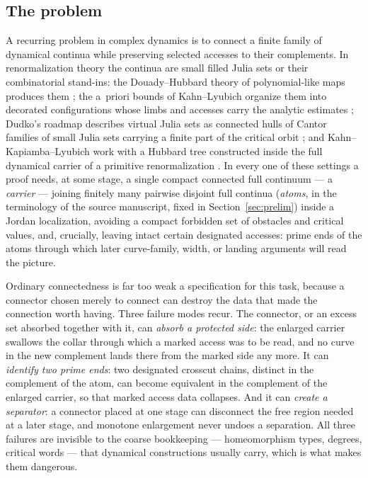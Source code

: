 \documentclass[11pt,reqno]{amsart}
\theoremstyle{definition}
\theoremstyle{remark}
\begin{document}
\subsection{The problem}\label{subsec:A-problem}

A recurring problem in complex dynamics is to connect a finite family of
dynamical continua while preserving selected accesses to their complements.
In renormalization theory the continua are small filled Julia sets or their
combinatorial stand-ins: the Douady--Hubbard theory of polynomial-like maps
produces them \cite{DH85}; the a~priori bounds of Kahn--Lyubich organize them
into decorated configurations whose limbs and accesses carry the analytic
estimates \cite{KL08}; Dudko's roadmap describes virtual Julia sets as
connected hulls of Cantor families of small Julia sets carrying a finite part
of the critical orbit \cite{Dud25}; and Kahn--Kapiamba--Lyubich work with a
Hubbard tree constructed inside the full dynamical carrier of a primitive
renormalization \cite{KKL26}.  In every one of these settings a proof needs,
at some stage, a single compact connected full continuum --- a
\emph{carrier} --- joining finitely many pairwise disjoint full continua
(\emph{atoms}, in the terminology of the source manuscript, fixed in
Section~\ref{sec:prelim}) inside a Jordan localization, avoiding a compact
forbidden set of obstacles and critical values, and, crucially, leaving
intact certain designated accesses: prime ends of the atoms through which
later curve-family, width, or landing arguments will read the picture.

Ordinary connectedness is far too weak a specification for this task,
because a connector chosen merely to connect can destroy the data that made
the connection worth having.  Three failure modes recur.  The connector, or
an excess set absorbed together with it, can \emph{absorb a protected side}:
the enlarged carrier swallows the collar through which a marked access was
to be read, and no curve in the new complement lands there from the marked
side any more.  It can \emph{identify two prime ends}: two designated
crosscut chains, distinct in the complement of the atom, can become
equivalent in the complement of the enlarged carrier, so that marked access
data collapses.  And it can \emph{create a separator}: a connector placed at
one stage can disconnect the free region needed at a later stage, and
monotone enlargement never undoes a separation.  All three failures are
invisible to the coarse bookkeeping --- homeomorphism types, degrees,
critical words --- that dynamical constructions usually carry, which is what
makes them dangerous.
\end{document}
